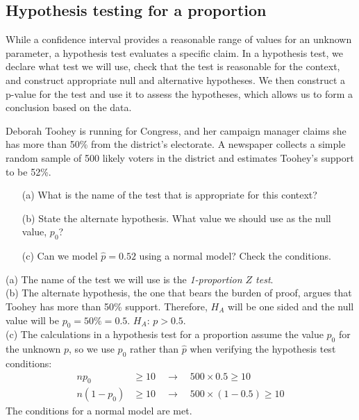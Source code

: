 \subsection{Hypothesis testing for a proportion}
\label{htForPropSection}

While a confidence interval provides a reasonable range of values for an unknown parameter, a hypothesis test evaluates a specific claim. In a hypothesis test, we declare what test we will use, check that the test is reasonable for the context, and construct appropriate null and alternative hypotheses. We then construct a p-value for the test and use it to assess the hypotheses, which allows us to form a conclusion based on the data.

\begin{example}{Deborah Toohey is running for Congress, and her campaign manager claims she has more than 50\% from the district's electorate. A newspaper collects a simple random sample of 500 likely voters in the district and estimates Toohey's support to be 52\%.
\begin{itemize}
\item[(a)] What is the name of the test that is appropriate for this context?
\item[(b)] State the alternate hypothesis. What value we should use as the null value, $p_{0}$?
\item[(c)] Can we model $\hat{p} = 0.52$ using a normal model? Check the conditions.
\end{itemize}}
\label{TooheyTestNameAndConditionExample}
(a) The name of the test we will use is the \emph{1-proportion $Z$ test}. \\[2mm]
(b) The alternate hypothesis, the one that bears the burden of proof, argues that Toohey has more than 50\% support. Therefore, $H_A$ will be one sided and the null value will be $p_0 = 50\% = 0.5$. $H_A$: $p > 0.5$. \\[2mm]
(c) The calculations in a hypothesis test for a proportion assume the value $p_0$ for the unknown $p$, so we use $p_{0}$ rather than $\hat{p}$ when verifying the hypothesis test conditions:
\begin{align*}
np_0 &\geq 10 \quad \rightarrow \quad 500\times 0.5 \geq 10 \\
n(1-p_0) &\geq 10 \quad \rightarrow \quad 500 \times (1-0.5) \geq 10
\end{align*}
The conditions for a normal model are met.
\end{example}

